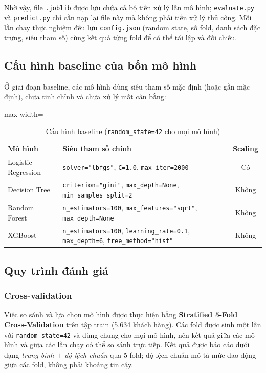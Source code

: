 Nhờ vậy, file \texttt{.joblib} được lưu chứa cả bộ tiền xử lý lẫn mô hình; \texttt{evaluate.py} và \texttt{predict.py} chỉ cần nạp lại file này mà không phải tiền xử lý thủ công. Mỗi lần chạy thực nghiệm đều lưu \texttt{config.json} (random state, số fold, danh sách đặc trưng, siêu tham số) cùng kết quả từng fold để có thể tái lập và đối chiếu.

\subsection{Cấu hình baseline của bốn mô hình}
Ở giai đoạn baseline, các mô hình dùng siêu tham số mặc định (hoặc gần mặc định), chưa tinh chỉnh và chưa xử lý mất cân bằng:

\begin{table}[H]
\centering
\begin{adjustbox}{max width=\textwidth}
\begin{tabular}{|l|p{9.5cm}|c|}
\hline
\textbf{Mô hình} & \textbf{Siêu tham số chính} & \textbf{Scaling} \\
\hline
Logistic Regression & \texttt{solver="lbfgs"}, \texttt{C=1.0}, \texttt{max\_iter=2000} & Có \\
\hline
Decision Tree & \texttt{criterion="gini"}, \texttt{max\_depth=None}, \texttt{min\_samples\_split=2} & Không \\
\hline
Random Forest & \texttt{n\_estimators=100}, \texttt{max\_features="sqrt"}, \texttt{max\_depth=None} & Không \\
\hline
XGBoost & \texttt{n\_estimators=100}, \texttt{learning\_rate=0.1}, \texttt{max\_depth=6}, \texttt{tree\_method="hist"} & Không \\
\hline
\end{tabular}
\end{adjustbox}
\caption{Cấu hình baseline (\texttt{random\_state=42} cho mọi mô hình)}
\end{table}

\subsection{Quy trình đánh giá}

\subsubsection{Cross-validation}
Việc so sánh và lựa chọn mô hình được thực hiện bằng \textbf{Stratified 5-Fold Cross-Validation} trên tập train (5.634 khách hàng). Các fold được sinh một lần với \texttt{random\_state=42} và dùng chung cho mọi mô hình, nên kết quả giữa các mô hình và giữa các lần chạy có thể so sánh trực tiếp. Kết quả được báo cáo dưới dạng \textit{trung bình $\pm$ độ lệch chuẩn} qua 5 fold; độ lệch chuẩn mô tả mức dao động giữa các fold, không phải khoảng tin cậy.

